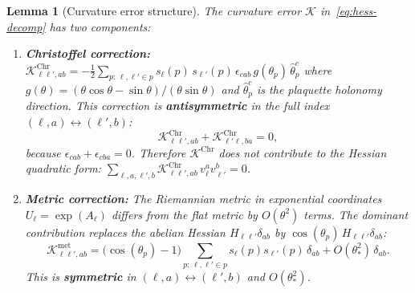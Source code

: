 \documentclass[11pt,a4paper]{article}
\theoremstyle{plain}
\newtheorem{lemma}[theorem]{Lemma}
\theoremstyle{definition}
\theoremstyle{remark}
\newcommand{\cK}{\mathcal{K}}
\begin{document}
\begin{lemma}[Curvature error structure]\label{lem:curv-leibniz}
The curvature error $\cK$ in~\eqref{eq:hess-decomp} has two
components:
\begin{enumerate}[label=(\alph*)]
\item \textbf{Christoffel correction:}
  $\cK^{\mathrm{Chr}}_{\ell\ell',ab}
  = -\frac{1}{2}\sum_{p:\,\ell,\ell' \in p}
  s_\ell(p)\,s_{\ell'}(p)\,\epsilon_{cab}\,g(\theta_p)\,\hat\theta_p^c$
  where $g(\theta) = (\theta\cos\theta - \sin\theta)/(\theta\sin\theta)$
  and $\hat\theta_p^c$ is the plaquette holonomy direction.
  This correction is \textbf{antisymmetric} in the full index
  $(\ell,a) \leftrightarrow (\ell',b)$:
  \begin{equation}
  \cK^{\mathrm{Chr}}_{\ell\ell',ab}
  + \cK^{\mathrm{Chr}}_{\ell'\ell,ba} = 0,
  \end{equation}
  because $\epsilon_{cab} + \epsilon_{cba} = 0$. Therefore
  $\cK^{\mathrm{Chr}}$ does not contribute to the Hessian quadratic
  form: $\sum_{\ell,a,\ell',b}
  \cK^{\mathrm{Chr}}_{\ell\ell',ab}\,v_\ell^a v_{\ell'}^b = 0$.

\item \textbf{Metric correction:} The Riemannian metric in
  exponential coordinates $U_\ell = \exp(A_\ell)$ differs from the
  flat metric by $O(\theta^2)$ terms. The dominant contribution
  replaces the abelian Hessian $H_{\ell\ell'}\delta_{ab}$ by
  $\cos(\theta_p)\,H_{\ell\ell'}\delta_{ab}$:
  \begin{equation}
  \cK^{\mathrm{met}}_{\ell\ell',ab}
  = \bigl(\cos(\theta_p) - 1\bigr)\sum_{p:\,\ell,\ell' \in p}
  s_\ell(p)s_{\ell'}(p)\,\delta_{ab}
  + O(\theta_*^2)\,\delta_{ab}.
  \end{equation}
  This is \textbf{symmetric} in $(\ell,a) \leftrightarrow (\ell',b)$
  and $O(\theta_*^2)$.
\end{enumerate}
\end{lemma}
\end{document}
